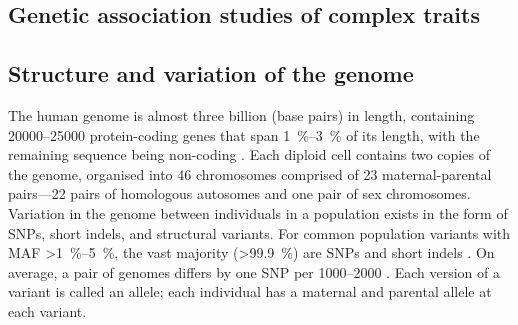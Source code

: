 \begin{outline}
\section{Genetic association studies of complex traits}

\subsection{Structure and variation of the genome}

The human genome is almost three billion \si{\bp} (base pairs) in length, 
containing \numrange{20000}{25000} protein-coding genes that span \SIrange{1}{3}{\percent} of its length, with the remaining sequence being non-coding \autocite{theencodeprojectconsortium2012IntegratedEncyclopediaDNA,1000genomesprojectconsortium2015GlobalReferenceHuman}.
Each diploid cell contains two copies of the genome, organised into 46 chromosomes comprised of 23 maternal-parental pairs---22 pairs of homologous autosomes and one pair of sex chromosomes.
Variation in the genome between individuals in a population exists in the form of \glspl{SNP}, short indels, and structural variants.
For common population variants with \gls{MAF} \SIrange{>1}{5}{\percent},
the vast majority (\SI{>99.9}{\percent}) are \glspl{SNP} and short indels \autocite{1000genomesprojectconsortium2015GlobalReferenceHuman}.
On average, a pair of genomes differs by one \gls{SNP} per \SIrange{1000}{2000}{\bp} \autocite{theinternationalsnpmapworkinggroup2001MapHumanGenome}.
Each version of a variant is called an allele; each individual has a maternal and parental allele at each variant.


\end{outline}
